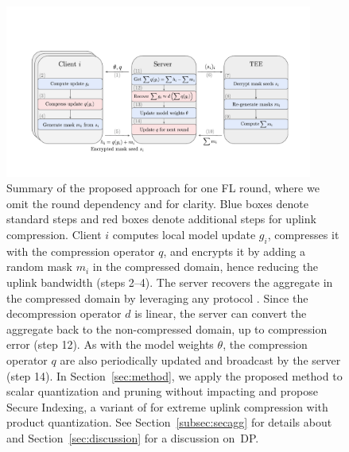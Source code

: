 \begin{figure}[t]
    \centering
    \includegraphics[width=0.9\textwidth]{submissions/GrahamCormode/figs/secagg_summary_new.pdf}
    \caption{\label{fig:secagg_summary}
    Summary of the proposed approach for one FL round, where we omit the round dependency and  for clarity. Blue boxes denote standard steps and red boxes denote additional steps for uplink compression. Client $i$ computes local model update $g_i$, compresses it with the compression operator $q$, and encrypts it by adding a random mask $m_i$ in the compressed domain, hence reducing the uplink bandwidth (steps 2--4). The server recovers the aggregate in the compressed domain by leveraging any \SecAgg protocol . Since the decompression operator $d$ is linear, the server can convert the aggregate back to the non-compressed domain, up to compression error (step 12). As with the model weights $\theta$, the compression operator $q$ are also periodically updated and broadcast by the server (step 14).
    In Section~\ref{sec:method}, we apply the proposed method to scalar quantization and pruning without impacting \SecAgg and propose Secure Indexing, a variant of \SecAgg for extreme uplink compression with product quantization. See Section~\ref{subsec:secagg} for details about \SecAgg and Section~\ref{sec:discussion} for a discussion on~DP.
    }
    \vspace{-3mm}
\end{figure}






